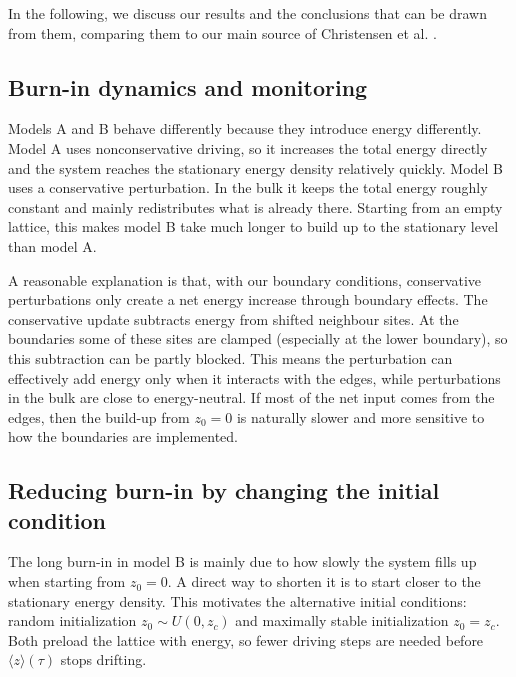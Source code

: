 In the following, we discuss our results and the conclusions that can be drawn from them, comparing them to our main source of Christensen et al. \cite{christensen1991dynamical}.

\subsection{Burn-in dynamics and monitoring}

Models A and B behave differently because they introduce energy differently. Model A uses nonconservative driving, so it increases the total energy directly and the system reaches the stationary energy density relatively quickly. Model B uses a conservative perturbation. In the bulk it keeps the total energy roughly constant and mainly redistributes what is already there. Starting from an empty lattice, this makes model B take much longer to build up to the stationary level than model A.

A reasonable explanation is that, with our boundary conditions, conservative perturbations only create a net energy increase through boundary effects. The conservative update subtracts energy from shifted neighbour sites. At the boundaries some of these sites are clamped (especially at the lower boundary), so this subtraction can be partly blocked. This means the perturbation can effectively add energy only when it interacts with the edges, while perturbations in the bulk are close to energy-neutral. If most of the net input comes from the edges, then the build-up from $z_0=0$ is naturally slower and more sensitive to how the boundaries are implemented.

\subsection{Reducing burn-in by changing the initial condition}

The long burn-in in model B is mainly due to how slowly the system fills up when starting from $z_0=0$. A direct way to shorten it is to start closer to the stationary energy density. This motivates the alternative initial conditions: random initialization $z_0\sim U(0,z_c)$ and maximally stable initialization $z_0=z_c$. Both preload the lattice with energy, so fewer driving steps are needed before $\langle z\rangle(\tau)$ stops drifting.

